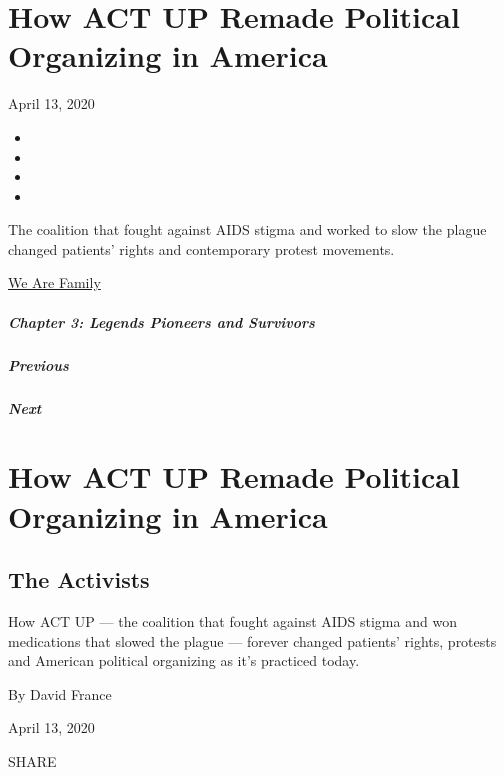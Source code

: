 \hypertarget{how-act-up-remade-political-organizing-in-america}{%
\section{How ACT UP Remade Political Organizing in
America}\label{how-act-up-remade-political-organizing-in-america}}

April 13, 2020

\begin{itemize}
\item
\item
\item
\item
\end{itemize}

The coalition that fought against AIDS stigma and worked to slow the
plague changed patients' rights and contemporary protest movements.

\href{https://www.nytimes3xbfgragh.onion/interactive/2020/04/13/t-magazine/culture-issue-2020.html}{We
Are Family}

\hypertarget{chapter-3-legends-pioneers-and-survivors}{%
\subparagraph{Chapter 3: Legends Pioneers and
Survivors}\label{chapter-3-legends-pioneers-and-survivors}}

\hypertarget{previous}{%
\subparagraph{Previous}\label{previous}}

\hypertarget{next}{%
\subparagraph{Next}\label{next}}

\hypertarget{how-act-up-remade-political-organizing-in-america-1}{%
\section{How ACT UP Remade Political Organizing in
America}\label{how-act-up-remade-political-organizing-in-america-1}}

\hypertarget{the-activists}{%
\subsection{The Activists}\label{the-activists}}

How ACT UP --- the coalition that fought against AIDS stigma and won
medications that slowed the plague --- forever changed patients' rights,
protests and American political organizing as it's practiced today.

By David France

April 13, 2020

SHARE

